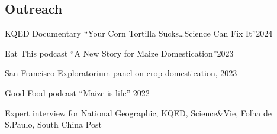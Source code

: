 \documentclass[letterpaper,10pt]{article}
\newcommand{\ignore}[1]{}
\renewenvironment{itemize}{
  \begin{list}{}{
    \setlength{\leftmargin}{1.5em}
  }
}{
  \end{list}
}
\begin{document}
\subsection*{Outreach}
\begin{itemize}
  \setlength\itemsep{0ex}
\item KQED Documentary ``Your Corn Tortilla Sucks…Science Can Fix It''\hfill 2024
\item Eat This podcast ``A New Story for Maize Domestication''\hfill 2023
\item San Francisco Exploratorium panel on crop domestication, \hfill 2023
\item Good Food podcast ``Maize is life'' \hfill 2022
\item Expert interview for \ignore{2023} National Geographic, \ignore{2023} KQED, \ignore{2023} Science\&Vie, \ignore{2023} Folha de S.Paulo, \newline \ignore{2023} South China Post 
\end{itemize}

\end{document}

